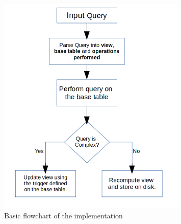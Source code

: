 \documentclass[12pt]{report}
\begin{document}
\begin{figure}[H]
\centering \includegraphics[width=0.8\textwidth]{images/flowchart.png}
\caption{Basic flowchart of the implementation}
\end{figure}
\end{document}
